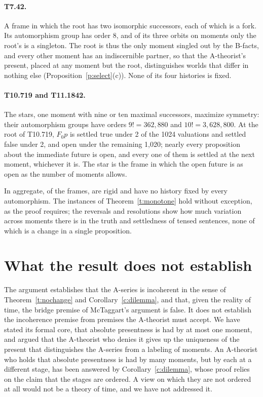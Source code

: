 \documentclass{situationist-preprint}
\begin{document}
\paragraph{T7.42.} A frame in which the root has two isomorphic successors, each of which is a fork. Its automorphism group has order 8, and of its three orbits on moments only the root's is a singleton. The root is thus the only moment singled out by the B-facts, and every other moment has an indiscernible partner, so that the A-theorist's present, placed at any moment but the root, distinguishes worlds that differ in nothing else (Proposition~\ref{p:select}(c)). None of its four histories is fixed.

\paragraph{T10.719 and T11.1842.} The stars, one moment with nine or ten maximal successors, maximize symmetry: their automorphism groups have orders $9! = 362{,}880$ and $10! = 3{,}628{,}800$. At the root of T10.719, $F_0 p$ is settled true under 2 of the 1024 valuations and settled false under 2, and open under the remaining 1,020; nearly every proposition about the immediate future is open, and every one of them is settled at the next moment, whichever it is. The star is the frame in which the open future is as open as the number of moments allows.

\medskip
In aggregate, of the \NFrames{} frames, \NRigid{} are rigid and \NNoFixH{} have no history fixed by every automorphism. The \NMonoChecks{} instances of Theorem~\ref{t:monotone} hold without exception, as the proof requires; the \NReversals{} reversals and \NResolutions{} resolutions show how much variation across moments there is in the truth and settledness of tensed sentences, none of which is a change in a single proposition.

\section{What the result does not establish}\label{s:limits}

The argument establishes that the A-series is incoherent in the sense of Theorem~\ref{t:nochange} and Corollary~\ref{c:dilemma}, and that, given the reality of time, the bridge premise of McTaggart's argument is false. It does not establish the incoherence premise from premises the A-theorist must accept. We have stated its formal core, that absolute presentness is had by at most one moment, and argued that the A-theorist who denies it gives up the uniqueness of the present that distinguishes the A-series from a labeling of moments. An A-theorist who holds that absolute presentness is had by many moments, but by each at a different stage, has been answered by Corollary~\ref{c:dilemma}, whose proof relies on the claim that the stages are ordered. A view on which they are not ordered at all would not be a theory of time, and we have not addressed it.
\end{document}
